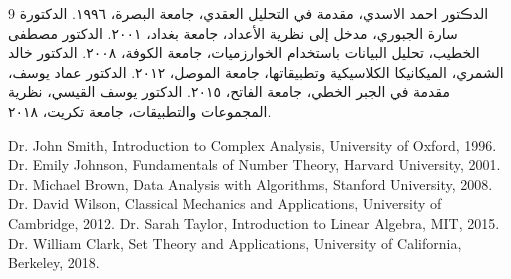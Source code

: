 \begin{thebibliography}{9}
	 الدڪتور احمد الاسدي، مقدمة في التحليل العقدي، جامعة البصرة، ١٩٩٦.
	 الدكتورة سارة الجبوري، مدخل إلى نظرية الأعداد، جامعة بغداد، ٢٠٠١.
	 الدكتور مصطفى الخطيب، تحليل البيانات باستخدام الخوارزميات، جامعة الكوفة، ٢٠٠٨.
	 الدكتور خالد الشمري، الميكانيكا الكلاسيكية وتطبيقاتها، جامعة الموصل، ٢٠١٢.
	 الدكتور عماد يوسف، مقدمة في الجبر الخطي، جامعة الفاتح، ٢٠١٥.
	 الدكتور يوسف القيسي، نظرية المجموعات والتطبيقات، جامعة تكريت، ٢٠١٨.
	
	\setLTR\timesfont
		 Dr. John Smith, Introduction to Complex Analysis, University of Oxford, 1996.
		 Dr. Emily Johnson, Fundamentals of Number Theory, Harvard University, 2001.
		 Dr. Michael Brown, Data Analysis with Algorithms, Stanford University, 2008.
		 Dr. David Wilson, Classical Mechanics and Applications, University of Cambridge, 2012.
		 Dr. Sarah Taylor, Introduction to Linear Algebra, MIT, 2015.
		 Dr. William Clark, Set Theory and Applications, University of California, Berkeley, 2018.
	
\end{thebibliography}
